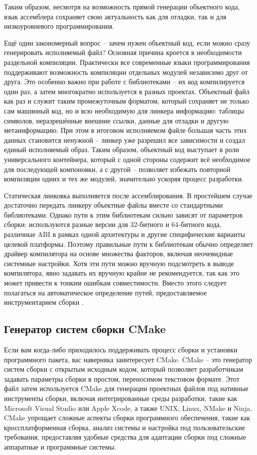 Таким образом, несмотря на возможность прямой генерации объектного кода, язык ассемблера сохраняет свою актуальность как для отладки, так и для низкоуровневого программирования.

Ещё один закономерный вопрос -- зачем нужен объектный код, если можно сразу генерировать исполняемый файл? Основная причина кроется в необходимости раздельной компиляции. Практически все современные языки программирования поддерживают возможность компиляции отдельных модулей независимо друг от друга. Это особенно важно при работе с библиотеками -- их код компилируется один раз, а затем многократно используется в разных проектах. Объектный файл как раз и служит таким промежуточным форматом, который сохраняет не только сам машинный код, но и всю необходимую для линкера информацию: таблицы символов, неразрешённые внешние ссылки, данные для отладки и другую метаинформацию. При этом в итоговом исполняемом файле большая часть этих данных становится ненужной -- линкер уже разрешил все зависимости и создал единый исполняемый образ. Таким образом, объектный код выступает в роли универсального контейнера, который с одной стороны содержит всё необходимое для последующей компоновки, а с другой -- позволяет избежать повторной компиляции одних и тех же модулей, значительно ускоряя процесс разработки.

Статическая линковка выполняется после ассемблирования. В простейшем случае достаточно передать линкеру объектные файлы вместе со стандартными библиотеками. Однако пути к этим библиотекам сильно зависят от параметров сборки: используются разные версии для 32-битного и 64-битного кода, различные ABI в рамках одной архитектуры и другие специфические варианты целевой платформы. Поэтому правильные пути к библиотекам обычно определяет драйвер компилятора на основе множества факторов, включая неочевидные системные настройки. Хотя эти пути можно вручную подсмотреть в выводе компилятора, явно задавать их вручную крайне не рекомендуется, так как это может привести к тонким ошибкам совместимости. Вместо этого следует полагаться на автоматическое определение путей, предоставляемое инструментарием сборки \cite{Vladimirov2024}.

\subsection{Генератор систем сборки CMake}

Если вам когда-либо приходилось поддерживать процесс сборки и установки программного пакета, вас наверняка заинтересует CMake. CMake -- это генератор систем сборки с открытым исходным кодом, который позволяет разработчикам задавать параметры сборки в простом, переносимом текстовом формате. Этот файл затем используется CMake для генерации проектных файлов под нативные инструменты сборки, включая интегрированные среды разработки, такие как Microsoft Visual Studio или Apple Xcode, а также UNIX, Linux, NMake и Ninja. CMake упрощает сложные аспекты сборки программного обеспечения, такие как кроссплатформенная сборка, анализ системы и настройка под пользовательские требования, предоставляя удобные средства для адаптации сборки под сложные аппаратные и программные системы.

